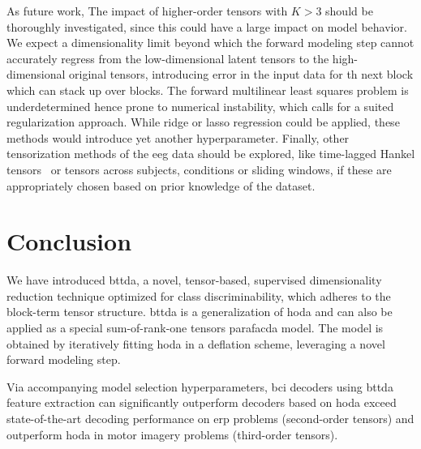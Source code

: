 \documentclass[twocolumn]{article}
\begin{document}
As future work, The impact of higher-order tensors with $K>3$ should be thoroughly
investigated, since this could have a large impact on model behavior.
We expect a dimensionality limit beyond which the forward modeling step cannot
accurately regress from the low-dimensional latent tensors to the
high-dimensional original tensors, introducing error in the input data for th
next block which can stack up over blocks.
The forward multilinear least squares problem is underdetermined hence prone to
numerical instability, which calls for a suited regularization approach.
While ridge or lasso regression could be applied, these methods would introduce
yet another hyperparameter.
Finally, other tensorization methods of the \ac{eeg} data should be explored,
like time-lagged Hankel tensors~\cite{Papy2005} or tensors across subjects,
conditions or sliding windows, if these are appropriately chosen based on prior
knowledge of the dataset.

\section{Conclusion}

We have introduced \acf{bttda}, a novel,
tensor-based, supervised dimensionality reduction technique optimized for class
discriminability, which adheres to the block-term tensor structure.
\Ac{bttda} is a generalization of \acf{hoda} and can also be
applied as a special sum-of-rank-one tensors \ac{parafacda} model.
The model is obtained by iteratively fitting \ac{hoda} in a deflation scheme,
leveraging a novel forward modeling step.

Via accompanying model selection hyperparameters, \ac{bci} decoders using
\ac{bttda} feature extraction can significantly outperform decoders based on
\ac{hoda} exceed state-of-the-art decoding performance on \acl{erp} problems
(second-order tensors) and outperform \ac{hoda} in motor imagery problems (third-order tensors).
\end{document}
